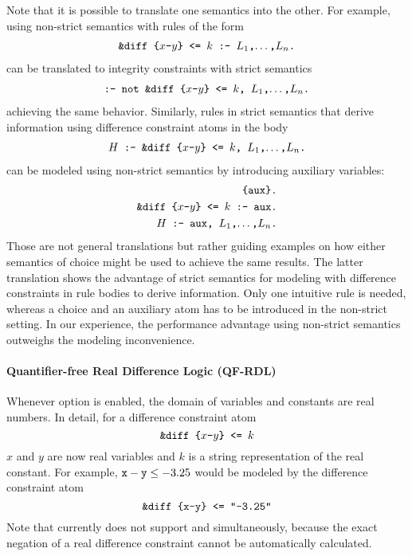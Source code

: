 Note that it is possible to translate one semantics into the other.
For example, using non-strict semantics with rules of the form 
  \begin{align*}
    \texttt{\&diff\text{ }\{$x$-$y$\}\text{ }<=\text{ }$k$ :- $L_1$,$\dots$,$L_n$.}
  \end{align*}
can be translated to integrity constraints with strict semantics
  \begin{align*}
    \texttt{:- not \&diff\text{ }\{$x$-$y$\}\text{ }<=\text{ }$k$, $L_1$,$\dots$,$L_n$.}
  \end{align*}
achieving the same behavior.
Similarly, rules in strict semantics that derive information using difference constraint atoms in the body
  \begin{align*}
    \texttt{$H$ :- \&diff\text{ }\{$x$-$y$\}\text{ }<=\text{ }$k$, $L_1$,$\dots$,$L_n$.}
  \end{align*}
can be modeled using non-strict semantics by introducing auxiliary variables:
  \begin{align*}
    \texttt{\{aux\}.}\\
    \texttt{\&diff\text{ }\{$x$-$y$\}\text{ }<=\text{ }$k$ :- aux.}\\
    \texttt{$H$ :- aux, $L_1$,$\dots$,$L_n$.}
  \end{align*}
Those are not general translations but rather guiding examples on how either semantics of choice might be used to achieve the same results.
The latter translation shows the advantage of strict semantics for modeling with difference constraints in rule bodies to derive information.
Only one intuitive rule is needed, whereas a choice and an auxiliary atom has to be introduced in the non-strict setting.
In our experience, the performance advantage using non-strict semantics outweighs the modeling inconvenience.

\paragraph{Quantifier-free Real Difference Logic (QF-RDL)}

Whenever option  is enabled, the domain of variables and constants are real numbers.
In detail, for a difference constraint atom
 \[
    \texttt{\&diff\text{ }\{$x$-$y$\}\text{ }<=\text{ }$k$}
 \]
 $x$ and $y$ are now real variables and $k$ is a string representation of the real constant.
For example, $\texttt{x}-\texttt{y}\leq -3.25$ would be modeled by the difference constraint atom
 \[
    \texttt{\&diff\text{ }\{x-y\}\text{ }<=\text{ }"-3.25"}
 \]
Note that  currently does not support  and  simultaneously,
because the exact negation of a real difference constraint cannot be automatically calculated.

